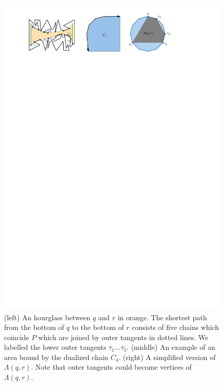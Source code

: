 \documentclass[a4paper, UKenglish]{lipics-v2018}
\begin{document}
\begin{figure}[h]
    \centering
    \includegraphics[]{../chain}
    \caption{(left) An hourglass between $q$ and $r$ in orange. The shortest path from the bottom of $q$ to the bottom of $r$ consists of five chains which coincide $P$ which are joined by outer tangents in dotted lines. We labelled the lower outer tangents $\tau_1 \ldots \tau_5$. (middle) An example of an area bound by the dualized chain $C_4$. (right) A simplified version of $\Lambda(q,r)$. Note that outer tangents could become vertices of $\Lambda(q,r)$.}
    \label{fig:chain}
\end{figure}
\end{document}
